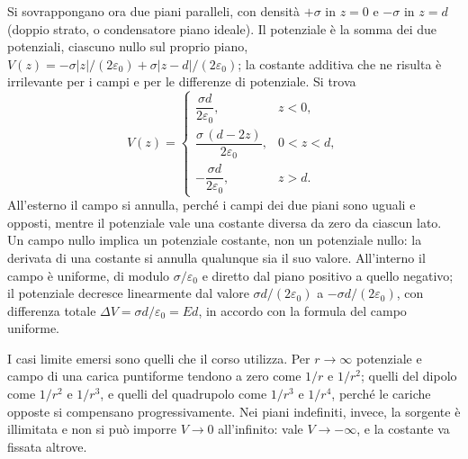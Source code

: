 \documentclass[11pt,a4paper]{article}
\begin{document}
Si sovrappongano ora due piani paralleli, con densità $+\sigma$ in $z=0$ e $-\sigma$ in $z=d$ (doppio strato, o condensatore piano ideale). Il potenziale è la somma dei due potenziali, ciascuno nullo sul proprio piano, $V(z)=-\sigma|z|/(2\varepsilon_0)+\sigma|z-d|/(2\varepsilon_0)$; la costante additiva che ne risulta è irrilevante per i campi e per le differenze di potenziale. Si trova
\[
V(z)=\begin{cases}
\dfrac{\sigma d}{2\varepsilon_0}, & z<0,\\[2mm]
\dfrac{\sigma\,(d-2z)}{2\varepsilon_0}, & 0<z<d,\\[2mm]
-\dfrac{\sigma d}{2\varepsilon_0}, & z>d.
\end{cases}
\]
All'esterno il campo si annulla, perché i campi dei due piani sono uguali e opposti, mentre il potenziale vale una costante diversa da zero da ciascun lato. Un campo nullo implica un potenziale costante, non un potenziale nullo: la derivata di una costante si annulla qualunque sia il suo valore. All'interno il campo è uniforme, di modulo $\sigma/\varepsilon_0$ e diretto dal piano positivo a quello negativo; il potenziale decresce linearmente dal valore $\sigma d/(2\varepsilon_0)$ a $-\sigma d/(2\varepsilon_0)$, con differenza totale $\Delta V=\sigma d/\varepsilon_0=Ed$, in accordo con la formula del campo uniforme.

I casi limite emersi sono quelli che il corso utilizza. Per $r\to\infty$ potenziale e campo di una carica puntiforme tendono a zero come $1/r$ e $1/r^2$; quelli del dipolo come $1/r^2$ e $1/r^3$, e quelli del quadrupolo come $1/r^3$ e $1/r^4$, perché le cariche opposte si compensano progressivamente. Nei piani indefiniti, invece, la sorgente è illimitata e non si può imporre $V\to0$ all'infinito: vale $V\to-\infty$, e la costante va fissata altrove.
\end{document}
